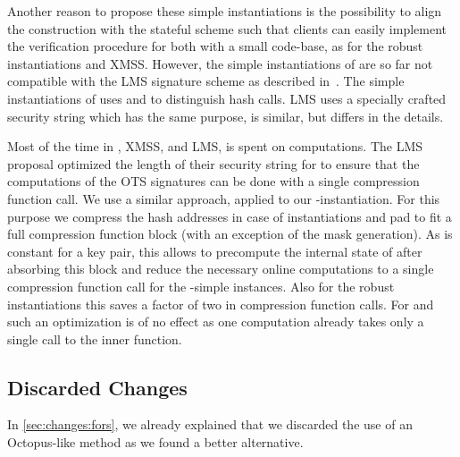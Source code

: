 Another reason to propose these simple instantiations is the possibility to align the construction 
with the stateful scheme \cite{LMSdraft} such that clients can easily implement the verification 
procedure for both with a small code-base, as for the robust instantiations and XMSS. However, the simple instantiations of \spx are so far not compatible with the LMS signature scheme as described in~\cite{LMSdraft}. The simple instantiations of \spx uses \pseed and \adrs to distinguish hash calls. LMS uses a specially crafted security string which has the same purpose, is similar, but differs in the details.

Most of the time in \spx, XMSS, and LMS, is spent on \sphincsF computations. The LMS proposal \cite{LMSdraft} optimized the length of their security string for \shatwo to ensure that the \sphincsF computations of the OTS signatures can be done with a single compression function call. 
We use a similar approach, applied to our \spx-\shatwo instantiation. For this purpose we compress the hash addresses in case of \shatwo instantiations and pad \pseed to fit a full compression function block (with an exception of the mask generation). As \pseed is constant for a key pair, this allows to precompute the internal state of \shatwo after absorbing this block and reduce the necessary online computations to a single compression function call for the \shatwo-simple instances. Also for the robust instantiations this saves a factor of two in compression function calls. For \shathree and \haraka such an optimization is of no effect as one \sphincsF computation already takes only a single call to the inner function. 

\subsection{Discarded Changes}
In \autoref{sec:changes:fors}, we already explained that we discarded the use of 
an Octopus-like method as we found a better alternative. 


